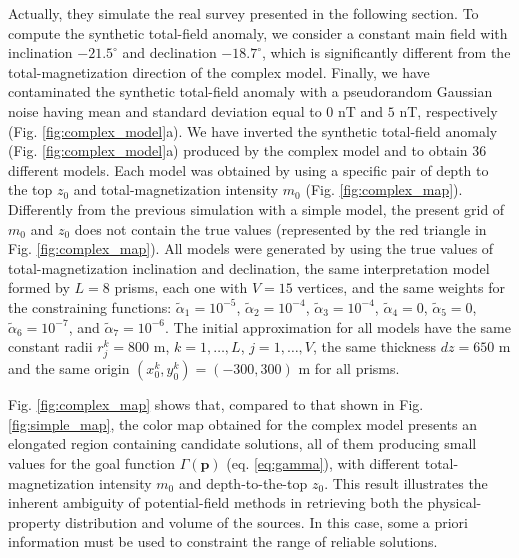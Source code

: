 Actually, they simulate the real survey presented in the following section. To compute the synthetic total-field anomaly, we consider a constant main field with inclination $ -21.5^\circ $ and declination $ -18.7^\circ $, which is significantly different from the total-magnetization direction of the complex model. Finally, we have
contaminated the synthetic total-field anomaly with a pseudorandom Gaussian noise having mean and standard deviation equal to $0$ nT and $5$ nT, respectively (Fig. \ref{fig:complex_model}a). We have inverted the synthetic total-field anomaly (Fig. \ref{fig:complex_model}a) produced by the complex model and to obtain 36 different models. Each model was obtained by using a specific pair of depth to the top $ z_0 $
and total-magnetization intensity $ m_0 $ (Fig. \ref{fig:complex_map}). Differently from the previous simulation with a simple model, the present grid of $ m_0 $ and $ z_0 $ does not contain the true values (represented by the red triangle in Fig. \ref{fig:complex_map}). All models were generated by using the true values of total-magnetization inclination and declination, the same interpretation model formed by $ L = 8 $ prisms, each one with $ V = 15 $ vertices, and the same weights for the constraining functions: $\tilde{\alpha}_1 = 10^{-5}$, $\tilde{\alpha}_2 = 10^{-4}$, $\tilde{\alpha}_3 = 10^{-4}$, $\tilde{\alpha}_4 = 0$, $\tilde{\alpha}_5 = 0$, $\tilde{\alpha}_6 = 10^{-7}$, and $\tilde{\alpha}_7 = 10^{-6}$. The initial approximation for all models have the same constant radii $ r^k_j = 800 $ m, $ k = 1, \dots, L $, $ j = 1, \dots, V $, the same thickness $ dz = 650 $ m and the same origin $ (x^k_0, y^k_0) = (-300, 300) $ m for all prisms.

Fig. \ref{fig:complex_map} shows that, compared to that shown in 
Fig. \ref{fig:simple_map}, the color map obtained for the complex model 
presents an elongated region containing candidate solutions, all of them 
producing small values for the goal function $ \Gamma(\mathbf{p}) $ (eq. \ref{eq:gamma}),
with different total-magnetization intensity $ m_0 $ and depth-to-the-top $z_0$. 
This result illustrates the inherent ambiguity of potential-field methods in 
retrieving both the physical-property distribution and volume of the sources. 
In this case, some a priori information must 
be used to constraint the range of reliable solutions.

